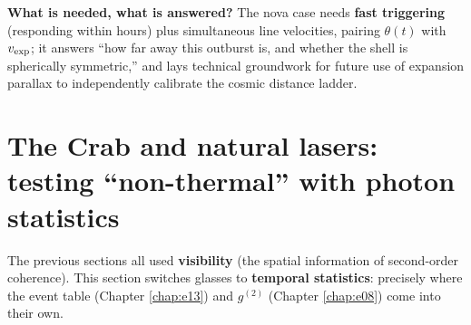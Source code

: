 \textbf{What is needed, what is answered?} The nova case needs \textbf{fast triggering} (responding within hours) plus simultaneous line velocities, pairing \(\theta(t)\) with \(v_{\rm exp}\); it answers ``how far away this outburst is, and whether the shell is spherically symmetric,'' and lays technical groundwork for future use of expansion parallax to independently calibrate the cosmic distance ladder.

\section{The Crab and natural lasers: testing ``non-thermal'' with photon statistics}
\label{sec:e25-statistics}

The previous sections all used \textbf{visibility} (the spatial information of second-order coherence). This section switches glasses to \textbf{temporal statistics}: precisely where the event table (Chapter \ref{chap:e13}) and \(g^{(2)}\) (Chapter \ref{chap:e08}) come into their own.

